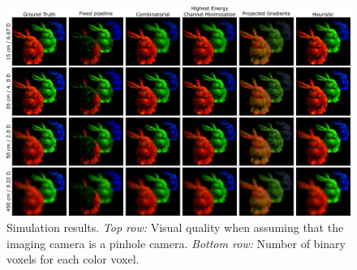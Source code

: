 \begin{figure}[h!]
\centering
\includegraphics[width=0.99\columnwidth]{images/volumetric/acd_exp3/exp_FS}
\caption[Adaptive color decomposition: focal stack]{Simulation results. \emph{Top row:} Visual quality when assuming that the imaging camera is a pinhole camera. \emph{Bottom row:} Number of binary voxels for each color voxel.}
\label{fig:volumetric:acd:exp3:focalstack}
\end{figure}

